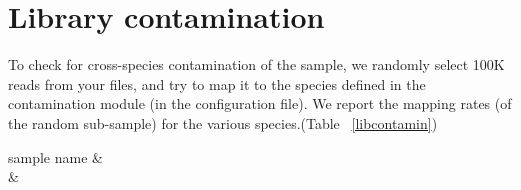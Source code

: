 
\section*{Library contamination}
To check for cross-species contamination of the sample, we randomly select 100K reads from your files, and try to map it to the species defined in the contamination module (in the configuration file).  We report the mapping rates (of the random sub-sample) for the various species.(Table ~\ref{libcontamin})
\begin{table}[H]
\caption{Library contamination}\label{libcontamin}
\begin{tabular}{}
\hline
sample name &  \\
\hline
{}
 &  \\
\hline
\end{tabular}
\end{table}

